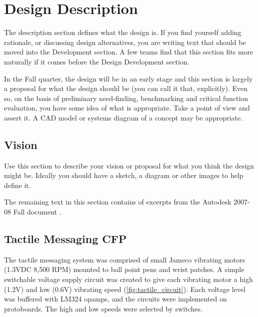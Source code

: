 \chapter{Design Description}
\label{design-description}

\begin{remark}\color{blue}
The description section defines what the design is. If you find yourself adding rationale, or discussing design alternatives, you are writing text that should be moved into the Development section. A few teams find that this section fits more naturally if it comes before the Design Development section.

In the Fall quarter, the design will be in an early stage and this section is largely a proposal for what the design should be (you can call it that, explicitly). Even so, on the basis of preliminary need-finding, benchmarking and critical function evaluation, you have some idea of what is appropriate. Take a point of view and assert it. A CAD model or systems diagram of a concept may be appropriate.
\normalcolor \end{remark}

\section{Vision}
\label{vision}

\begin{remark}\color{blue}
Use this section to describe your vision or proposal for what you think the design might be. Ideally you should have a sketch, a diagram or other images to help define it.
\normalcolor\end{remark}

The remaining text in this section contains of excerpts from the Autodesk 2007-08 Fall document \cite{Autodesk2008Fall}.

\section{Tactile Messaging CFP}

The tactile messaging system was comprised of small Jameco vibrating motors (1.3VDC 8,500 RPM) mounted to ball point pens and wrist patches. A simple switchable voltage supply circuit was created to give each vibrating motor a high (1.2V) and low (0.6V) vibrating speed (\ref{fig:tactile_circuit}). Each voltage level was buffered with LM324 opamps, and the circuits were implemented on protoboards. The high and low speeds were selected by switches. 

